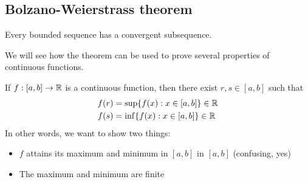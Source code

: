 \subsection{Bolzano-Weierstrass theorem}
\begin{definition}
  Every bounded sequence has a convergent subsequence.
\end{definition}
We will see how the theorem can be used to prove several properties of continuous functions.
\begin{prop}
  If $f: [a, b] \to \mathbb{R}$ is a continuous function, then there exist $r, s \in [a, b]$ such that
  \begin{align*}
    f(r) &= \sup\{f(x) : x \in [a, b]\} \in \mathbb{R} \\ 
    f(s) &= \inf\{f(x) : x \in [a, b]\} \in \mathbb{R}
  \end{align*}
  In other words, we want to show two things:
  \begin{itemize}
    \item $f$ attains its maximum and minimum in $[a, b]$ in $[a, b]$ (confusing, yes)
    \item The maximum and minimum are finite
  \end{itemize}
\end{prop}
